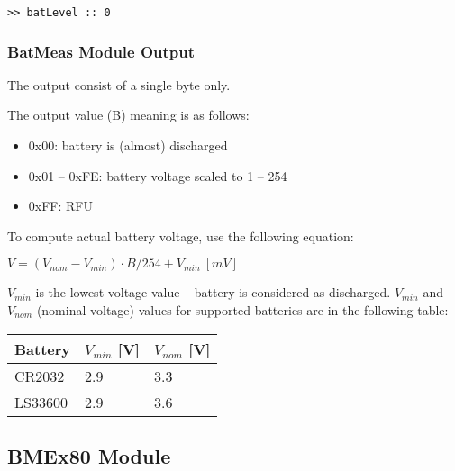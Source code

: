 \begin{docCodeExample}
\begin{verbatim}
>> batLevel :: 0
\end{verbatim}
\end{docCodeExample}

\subsubsection{BatMeas Module Output}
  The  output consist of a single byte only.
  
  The  output value (B) meaning is as follows:
  
  \begin{itemize}
    \item 0x00: battery is (almost) discharged
    \item 0x01 -- 0xFE: battery voltage scaled to 1 -- 254
    \item 0xFF: RFU
  \end{itemize}
  
  To compute actual battery voltage, use the following equation:
  
  $V = (V_{nom} - V_{min}) \cdot B/254 + V_{min} ~[mV]$
  
  $V_{min}$ is the lowest voltage value -- battery is considered as discharged. $V_{min}$ and $V_{nom}$ (nominal voltage) values for supported batteries are in the following table:
  
  \begin{table*}[!ht]
    \begin{tabular}{| p{3.5cm} | p{2cm} | p{2cm} |}
        \hline
        \rowcolor{SeaGreen3!30!} {\bf Battery} & $V_{min}$ [V] & $V_{nom}$ [V] \\
        \hline
        \hline
        CR2032 & 2.9 & 3.3 \\
        \hline
        LS33600 & 2.9 & 3.6 \\
        \hline
    \end{tabular}
    \label{tab:spec:AMR}
   \end{table*}
  

\clearpage
\subsection{BMEx80 Module}

